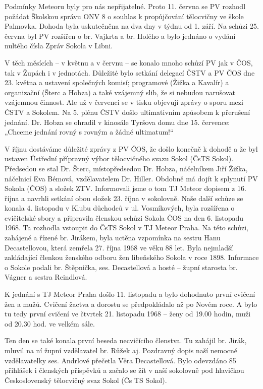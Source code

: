 Podmínky Meteoru byly pro nás nepřijatelné. Proto 11. června se PV
rozhodl požádat Školskou správu ONV 8 o souhlas k propůjčování
tělocvičny ve škole Palmovka. Dohoda byla uskutečněna na dva dny v týdnu
od 1. září. Na schůzi 25. června byl PV rozšířen o br. Vajkrta a br.
Holého a bylo jednáno o vydání nultého čísla Zpráv Sokola v Libni.

V těch měsících -- v květnu a v červnu -- se konalo mnoho schůzí PV jak
v ČOS, tak v Župách i v jednotách. Důležité bylo setkání delegací ČSTV a
PV ČOS dne 23. května a ustavení společných komisí; programové (Žižka a
Kavalír) a organizační (Šterc a Hobza) a také vzájemný slib, že si
nebudou narušovat vzájemnou činnost. Ale už v červenci se v tisku
objevují zprávy o sporu mezi ČSTV a Sokolem. Na 5. plénu ČSTV došlo
ultimativním způsobem k přerušení jednání. Dr. Hobza se ohradil v
kinosále Tyršova domu dne 15. července: „Chceme jednání rovný s rovným a
žádné ultimatum!{}``

V říjnu dostáváme důležité zprávy z PV ČOS, že došlo konečně k dohodě a
že byl ustaven Ústřední přípravný výbor tělocvičného svazu Sokol (ČsTS
Sokol). Předsedou se stal Dr. Šterc, místopředsedou Dr. Hobza,
náčelníkem Jiří Žižka, náčelnicí Eva Bémová, vzdělavatelem Dr. Hiller.
Obdobně má dojít k splynutí PV Sokola (ČOS) a složek ZTV. Informovali
jsme o tom TJ Meteor dopisem z 16. října a navrhli setkání obou složek
23. října v sokolovně. Naše další schůze se konala 4. listopadu v Klubu
důchodců v ul. Vosmíkových, byla rozšířena o cvičitelské sbory a
připravila členskou schůzi Sokola ČOS na den 6. listopadu 1968. Ta
rozhodla vstoupit do ČsTS Sokol v TJ Meteor Praha. Na této schůzi,
zahájené a řízené br. Jirákem, byla uctěna vzpomínka na sestru Hanu
Decastellovou, která zemřela 27. října 1968 ve věku 88 let. Byla
nejmladší zakládající členkou ženského odboru žen libeňského Sokola v
roce 1898. Informace o Sokole podali br. Štěpnička, ses. Decastellová a
hosté -- župní starosta br. Vágner a sestra Reindlová.

K jednání s TJ Meteor Praha došlo 11. listopadu a bylo dohodnuto první
cvičení žen a mužů. Cvičení žactva a dorostu se předpokládalo až po
Novém roce. A bylo tu tedy první cvičení ve čtvrtek 21. listopadu 1968
-- ženy od 19.00 hodin, muži od 20.30 hod. ve velkém sále.

Ten den se také konala první beseda necvičícího členstva. Tu zahájil br.
Jirák, mluvil na ní župní vzdělavatel br. Růžek aj. Pozdravný dopis naší
nemocné vzdělavatelky ses. Andrlové přečetla Věra Decastellová. Bylo
odevzdáno 85 přihlášek i členských příspěvků a začalo se žít v naší
sokolovně pod hlavičkou Československý tělocvičný svaz Sokol (Čs TS
Sokol).

